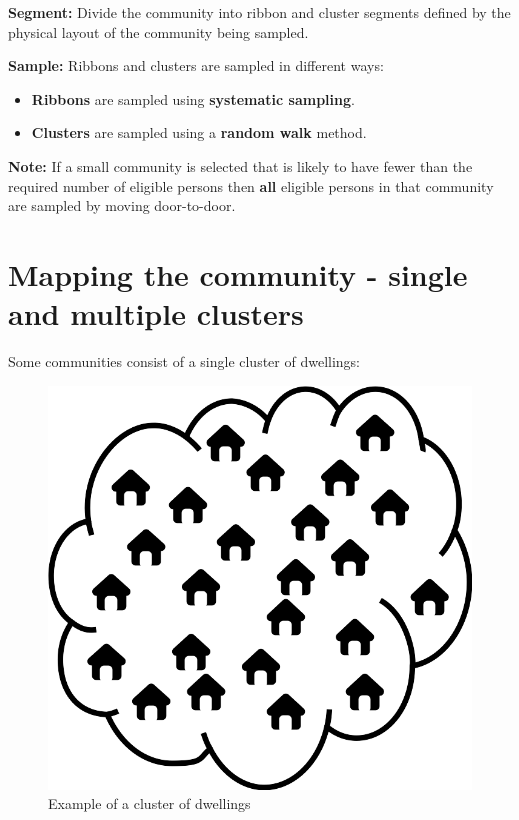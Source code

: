 \documentclass[12pt,]{book}
\providecommand{\tightlist}{%
  \setlength{\itemsep}{0pt}\setlength{\parskip}{0pt}}
\theoremstyle{definition}
\theoremstyle{definition}
\theoremstyle{definition}
\theoremstyle{remark}
\begin{document}
\textbf{Segment:} Divide the community into ribbon and cluster segments
defined by the physical layout of the community being sampled.

\textbf{Sample:} Ribbons and clusters are sampled in different ways:

\begin{itemize}
\tightlist
\item
  \textbf{Ribbons} are sampled using \textbf{systematic sampling}.
\item
  \textbf{Clusters} are sampled using a \textbf{random walk} method.
\end{itemize}

\textbf{Note:} If a small community is selected that is likely to have
fewer than the required number of eligible persons then \textbf{all}
eligible persons in that community are sampled by moving door-to-door.

\hypertarget{mapping-the-community---single-and-multiple-clusters}{%
\section{Mapping the community - single and multiple
clusters}\label{mapping-the-community---single-and-multiple-clusters}}

Some communities consist of a single cluster of dwellings:

\begin{figure}[h]

{\centering \includegraphics[width=9.72in]{figures/stage2sample2} 

}

\caption{Example of a cluster of dwellings}\label{fig:sample12}
\end{figure}
\end{document}
